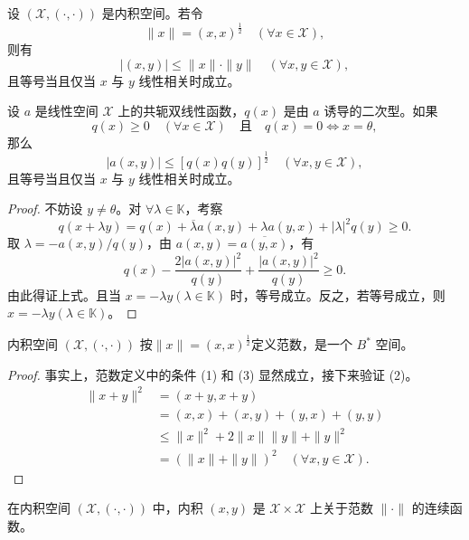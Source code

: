 \documentclass[lang=cn,newtx,10pt,scheme=chinese,thmcnt=chapter]{elegantbook}
\begin{document}
\begin{proposition}
设 $(\mathscr{X}, (\cdot, \cdot))$ 是内积空间。若令
\[
\|x\| = (x, x)^{\frac{1}{2}} \quad (\forall x \in \mathscr{X}),
\]
则有
\[
|(x, y)| \leqslant \|x\| \cdot \|y\| \quad (\forall x, y \in \mathscr{X}),
\]
且等号当且仅当 $x$ 与 $y$ 线性相关时成立。
\end{proposition}

\begin{proposition}
设 $a$ 是线性空间 $\mathscr{X}$ 上的共轭双线性函数，$q(x)$ 是由 $a$ 诱导的二次型。如果
\[
q(x) \geqslant 0 \quad (\forall x \in \mathscr{X}) \quad \text{且} \quad q(x) = 0 \Longleftrightarrow x = \theta,
\]
那么
\[
|a(x, y)| \leqslant [q(x) q(y)]^{\frac{1}{2}} \quad (\forall x, y \in \mathscr{X}),
\]
且等号当且仅当 $x$ 与 $y$ 线性相关时成立。
\end{proposition}
\begin{proof}
不妨设 $y \neq \theta$。对 $\forall \lambda \in \mathbb{K}$，考察
\[
q(x + \lambda y) = q(x) + \overline{\lambda} a(x, y) + \lambda a(y, x) + |\lambda|^2 q(y) \geqslant 0.
\]
取 $\lambda = -a(x, y) / q(y)$，由 $a(x, y) = \overline{a(y, x)}$，有
\[
q(x) - \frac{2|a(x, y)|^2}{q(y)} + \frac{|a(x, y)|^2}{q(y)} \geqslant 0.
\]
由此得证上式。且当 $x = -\lambda y (\lambda \in \mathbb{K})$ 时，等号成立。反之，若等号成立，则 $x = -\lambda y (\lambda \in \mathbb{K})$。
\end{proof}
\begin{proposition}
内积空间 $(\mathscr{X}, (\cdot, \cdot))$ 按$\|x\|=(x,x)^{\frac{1}{2}}$定义范数，是一个 $B^*$ 空间。
\end{proposition}

\begin{proof}
事实上，范数定义中的条件 (1) 和 (3) 显然成立，接下来验证 (2)。
\begin{equation*}
\begin{aligned}
\|x+y\|^2 &= (x+y, x+y) \\
&= (x, x) + (x, y) + (y, x) + (y, y) \\
&\leqslant \|x\|^2 + 2\|x\|\|y\| + \|y\|^2 \\
&= (\|x\| + \|y\|)^2 \quad (\forall x, y \in \mathscr{X}).
\end{aligned}
\end{equation*}
\end{proof}

\begin{proposition}
在内积空间 $(\mathscr{X}, (\cdot, \cdot))$ 中，内积 $(x, y)$ 是 $\mathscr{X} \times \mathscr{X}$ 上关于范数 $\|\cdot\|$ 的连续函数。
\end{proposition}
\end{document}
